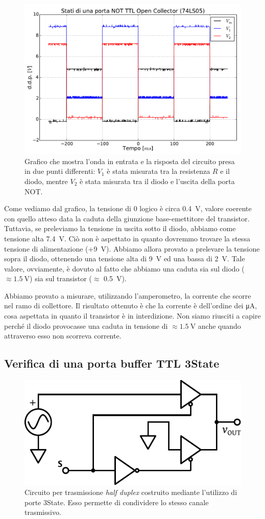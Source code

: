 \begin{figure}[htpc]
\centering
\includegraphics[width=.75\textwidth]{../E10/latex/NOTTTL.pdf}
\caption{Grafico che mostra l'onda in entrata e la risposta del circuito presa in due punti differenti: $V_1$ è stata misurata tra la resistenza $R$ e il diodo, mentre $V_2$ è stata misurata tra il diodo e l'uscita della porta NOT.}
\label{gr10:notttl}
\end{figure}

Come vediamo dal grafico, la tensione di 0 logico è circa \SI{0.4}{\volt}, valore coerente con quello atteso data la caduta della giunzione base-emettitore del transistor.
Tuttavia, se preleviamo la tensione in uscita sotto il diodo, abbiamo come tensione alta \SI{7.4}{\V}.
Ciò non è aspettato in quanto dovremmo trovare la stessa tensione di alimentazione (+\SI{9}{\V}).
Abbiamo allora provato a prelevare la tensione sopra il diodo, ottenendo una tensione alta di \SI{9}{\V} ed una bassa di \SI{2}{\V}.
Tale valore, ovviamente, è dovuto al fatto che abbiamo una caduta sia sul diodo ($\approx \SI{1.5}{\V}$) sia sul transistor ($\approx$ \SI{0.5}{\V}).

Abbiamo provato a misurare, utilizzando l'amperometro, la corrente che scorre nel ramo di collettore.
Il risultato ottenuto è che la corrente è dell'ordine dei \si{\micro\ampere}, cosa aspettata  in quanto il transistor è in interdizione.
Non siamo riusciti a capire perché il diodo provocasse una caduta in tensione di $\approx \SI{1.5}{\volt}$ anche quando attraverso esso non scorreva corrente.

\newpage
\subsection{Verifica di una porta buffer TTL 3State}

\begin{figure}
\centering
\includegraphics[width=.4\textwidth]{../E10/latex/impedence.pdf}
\caption{Circuito per trasmissione \textit{half duplex} costruito mediante l'utilizzo di porte 3State. Esso permette di condividere lo stesso canale trasmissivo.}
\label{cir10:tri-state}
\end{figure}

